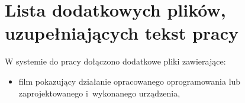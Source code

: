 \chapter{Lista dodatkowych plików, uzupełniających tekst pracy} 


W systemie do pracy dołączono dodatkowe pliki zawierające:
\begin{itemize}
\item film pokazujący działanie opracowanego oprogramowania lub zaprojektowanego i~wykonanego urządzenia,
\end{itemize}

